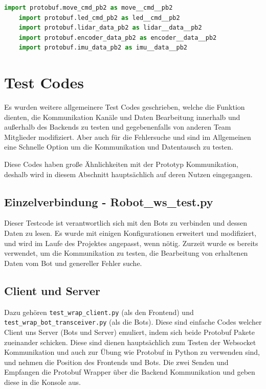 \begin{lstlisting}[language=python, gobble=4]
    import protobuf.move_cmd_pb2 as move__cmd__pb2
    import protobuf.led_cmd_pb2 as led__cmd__pb2
    import protobuf.lidar_data_pb2 as lidar__data__pb2
    import protobuf.encoder_data_pb2 as encoder__data__pb2
    import protobuf.imu_data_pb2 as imu__data__pb2
\end{lstlisting}




\section{Test Codes}
Es wurden weitere allgemeinere Test Codes geschrieben, 
welche die Funktion dienten, die Kommunikation Kanäle und Daten Bearbeitung innerhalb 
und außerhalb des Backends zu testen und gegebenenfalls 
von anderen Team Mitglieder modifiziert.
% 
Aber auch für die Fehlersuche 
und sind im Allgemeinen eine Schnelle Option 
um die Kommunikation und Datentausch zu testen.

Diese Codes haben große Ähnlichkeiten mit der Prototyp Kommunikation, 
deshalb wird in diesem Abschnitt hauptsächlich auf deren Nutzen eingegangen.

\subsection{Einzelverbindung - Robot\_ws\_test.py}
Dieser Testcode ist verantwortlich sich mit den Bots zu verbinden 
und dessen Daten zu lesen.
Es wurde mit einigen Konfigurationen erweitert und modifiziert, 
und wird im Laufe des Projektes angepasst, wenn nötig.
Zurzeit wurde es bereits verwendet, um die Kommunikation zu testen, 
die Bearbeitung von erhaltenen Daten vom Bot und genereller Fehler suche.

\subsection{Client und Server}
Dazu gehören \texttt{test\_wrap\_client.py} (als den Frontend) 
und \texttt{test\_wrap\_bot\_transceiver.py} (als die Bots).
Diese sind einfache Codes welcher Client uns Server (Bots und Server) emuliert, 
indem sich beide Protobuf Pakete zueinander schicken. 
Diese sind dienen hauptsächlich zum Testen der Websocket Kommunikation 
und auch zur Übung wie Protobuf in Python zu verwenden sind, 
und nehmen die Position des Frontends und Bots.
Die zwei Senden und Empfangen die Protobuf Wrapper über die Backend Kommunikation 
und geben diese in die Konsole aus.

